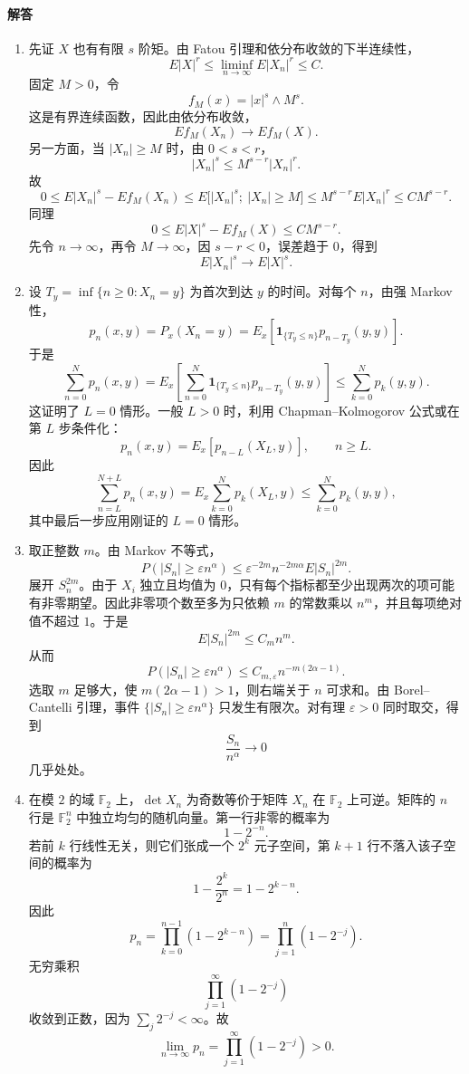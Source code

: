 \documentclass[UTF8,12pt]{ctexart}
\begin{document}
\paragraph{解答}
\begin{enumerate}[label=\textbf{\arabic*.},leftmargin=2.2em]
\item 先证 \(X\) 也有有限 \(s\) 阶矩。由 Fatou 引理和依分布收敛的下半连续性，
\[
E|X|^r\le \liminf_{n\to\infty}E|X_n|^r\le C.
\]
固定 \(M>0\)，令
\[
f_M(x)=|x|^s\wedge M^s.
\]
这是有界连续函数，因此由依分布收敛，
\[
E f_M(X_n)\to E f_M(X).
\]
另一方面，当 \(|X_n|\ge M\) 时，由 \(0<s<r\)，
\[
|X_n|^s\le M^{s-r}|X_n|^r.
\]
故
\[
0\le E|X_n|^s-E f_M(X_n)
\le E\bigl[|X_n|^s;\ |X_n|\ge M\bigr]
\le M^{s-r}E|X_n|^r
\le C M^{s-r}.
\]
同理
\[
0\le E|X|^s-E f_M(X)\le C M^{s-r}.
\]
先令 \(n\to\infty\)，再令 \(M\to\infty\)，因 \(s-r<0\)，误差趋于 \(0\)，得到
\[
E|X_n|^s\to E|X|^s.
\]

\item 设 \(T_y=\inf\{n\ge0:X_n=y\}\) 为首次到达 \(y\) 的时间。对每个 \(n\)，由强 Markov 性，
\[
p_n(x,y)=P_x(X_n=y)
=E_x\left[\mathbf 1_{\{T_y\le n\}}p_{n-T_y}(y,y)\right].
\]
于是
\[
\sum_{n=0}^{N}p_n(x,y)
=E_x\left[\sum_{n=0}^{N}\mathbf 1_{\{T_y\le n\}}p_{n-T_y}(y,y)\right]
\le \sum_{k=0}^{N}p_k(y,y).
\]
这证明了 \(L=0\) 情形。一般 \(L>0\) 时，利用 Chapman--Kolmogorov 公式或在第 \(L\) 步条件化：
\[
p_n(x,y)=E_x[p_{n-L}(X_L,y)],\qquad n\ge L.
\]
因此
\[
\sum_{n=L}^{N+L}p_n(x,y)
=E_x\sum_{k=0}^{N}p_k(X_L,y)
\le \sum_{k=0}^{N}p_k(y,y),
\]
其中最后一步应用刚证的 \(L=0\) 情形。

\item 取正整数 \(m\)。由 Markov 不等式，
\[
P(|S_n|\ge \varepsilon n^\alpha)
\le \varepsilon^{-2m}n^{-2m\alpha}E|S_n|^{2m}.
\]
展开 \(S_n^{2m}\)。由于 \(X_i\) 独立且均值为 \(0\)，只有每个指标都至少出现两次的项可能有非零期望。因此非零项个数至多为只依赖 \(m\) 的常数乘以 \(n^m\)，并且每项绝对值不超过 \(1\)。于是
\[
E|S_n|^{2m}\le C_m n^m.
\]
从而
\[
P(|S_n|\ge \varepsilon n^\alpha)
\le C_{m,\varepsilon} n^{-m(2\alpha-1)}.
\]
选取 \(m\) 足够大，使 \(m(2\alpha-1)>1\)，则右端关于 \(n\) 可求和。由 Borel--Cantelli 引理，事件 \(\{|S_n|\ge \varepsilon n^\alpha\}\) 只发生有限次。对有理 \(\varepsilon>0\) 同时取交，得到
\[
\frac{S_n}{n^\alpha}\to0
\]
几乎处处。

\item 在模 \(2\) 的域 \(\mathbb F_2\) 上，\(\det X_n\) 为奇数等价于矩阵 \(X_n\) 在 \(\mathbb F_2\) 上可逆。矩阵的 \(n\) 行是 \(\mathbb F_2^n\) 中独立均匀的随机向量。第一行非零的概率为
\[
1-2^{-n}.
\]
若前 \(k\) 行线性无关，则它们张成一个 \(2^k\) 元子空间，第 \(k+1\) 行不落入该子空间的概率为
\[
1-\frac{2^k}{2^n}=1-2^{k-n}.
\]
因此
\[
p_n=\prod_{k=0}^{n-1}(1-2^{k-n})
=\prod_{j=1}^{n}(1-2^{-j}).
\]
无穷乘积
\[
\prod_{j=1}^{\infty}(1-2^{-j})
\]
收敛到正数，因为 \(\sum_j2^{-j}<\infty\)。故
\[
\lim_{n\to\infty}p_n=\prod_{j=1}^{\infty}(1-2^{-j})>0.
\]


\end{enumerate}
\end{document}
